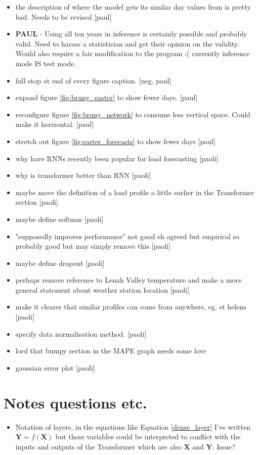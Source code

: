 \documentclass[conference]{IEEEtran}
\begin{document}
\begin{itemize}
	\item the description of where the model gets its similar day values from is pretty bad. Needs to be revised [paul]
	\item \textbf{PAUL} - Using all ten years in inference is certainly possible and probably valid. Need to harass a statistician and get their opinion on the validity. Would also require a fair modification to the program :(  currently inference mode IS test mode.
	\item full stop at end of every figure caption. [neg, paul]
	\item expand figure \ref{fig:bruny_easter} to show fewer days. [paul]
	\item reconfigure figure \ref{fig:bruny_network} to consume less vertical space. Could make it horizontal. [paul]
	\item stretch out figure \ref{fig:easter_forecasts} to show fewer days [paul]
	\item why have RNNs recently been popular for load forecasting [paoli]
	\item why is transformer better than RNN [paoli]
	\item maybe move the definition of a load profile a little earlier in the Transformer section [paoli]
	\item maybe define softmas [paoli]
	\item "supposedly improves performance" not good eh agreed but empirical so probably good but may simply remove this [paoli]
	\item maybe define dropout [paoli]
	\item perhaps remove reference to Lenah Valley temperature and make a more general statement about weather station location [paoli]
	\item make it clearer that similar profiles can come from anywhere, eg. st helens [paoli]
	\item specify data normalisation method. [paoli]
	\item lord that bumpy section in the MAPE graph needs some love
	\item gaussian error plot [paoli]
	
	
	
	
	
	
\end{itemize}

\section{Notes questions etc.} 
\begin{itemize}
	\item Notation of layers, in the equations like Equation \ref{dense_layer} I've written $\textbf{Y} = f(\textbf{X})$ but these variables could be interpreted to conflict with the inputs and outputs of the Transformer which are also $\textbf{X}$ and $\textbf{Y}$. Issue?
\end{itemize}
\end{document}
